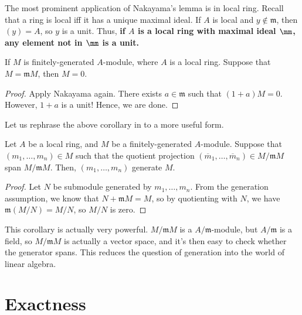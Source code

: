 The most prominent application of Nakayama's lemma
is in local ring.
Recall that a ring is local iff it has a unique maximal ideal.
If $A$ is local and $y\notin\mathfrak m$,
then $(y)=A$, so $y$ is a unit.
Thus, \textbf{if $A$ is a local ring with maximal ideal $\mm$,
any element not in $\mm$ is a unit.}
\begin{corollary}
    \label{cor:nakayama_local_ring}
    If $M$ is finitely-generated $A$-module, where
    $A$ is a local ring.
    Suppose that $M = \mathfrak m M$, then $M=0$.
\end{corollary}
\begin{proof}
    Apply Nakayama again.
    There exists $a\in\mathfrak m$ such that $(1+a)M = 0$.
    However, $1+a$ is a unit! Hence, we are done.
\end{proof}
Let us rephrase the above corollary in to a more useful form.
\begin{corollary}
    \label{cor:nakayama_generation}
    Let $A$ be a local ring, and $M$ be a finitely-generated
    $A$-module. 
    Suppose that $(m_1,\dots,m_n)\in M$
    such that the quotient projection 
    $(\overline m_1, \dots, \overline m_n)
    \in M/\mathfrak mM$ span $M/\mathfrak mM$.
    Then, $(m_1,\dots,m_n)$ generate $M$.
\end{corollary}
\begin{proof}
    Let $N$ be submodule generated by $m_1,\dots,m_n$.
    From the generation assumption,
    we know that $N+\mathfrak mM = M$,
    so by quotienting with $N$, we have
    $\mathfrak m(M/N) = M/N$, so $M/N$ is zero.
\end{proof}
This corollary is actually very powerful.
$M/\mathfrak mM$ is a $A/\mathfrak m$-module,
but $A/\mathfrak m$ is a field,
so $M/\mathfrak mM$ is actually a vector space,
and it's then easy to check whether the generator spans.
This reduces the question of generation
into the world of linear algebra.
%
%
%
%
\section{Exactness}
